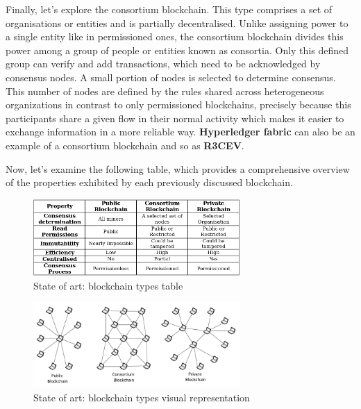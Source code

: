 Finally, let's explore the consortium blockchain. This type comprises a set of organisations or entities and is partially decentralised. Unlike assigning power to a single entity like in permissioned ones, the consortium blockchain divides this power among a group of people or entities known as consortia. Only this defined group can verify and add transactions, which need to be acknowledged by consensus nodes. A small portion of nodes is selected to determine consensus. This number of nodes are defined by the rules shared across heterogeneous organizations in contrast to only permissioned blockchains, precisely because this participants share a given flow in their normal activity which makes it easier to exchange information in a more reliable way. \textbf{Hyperledger fabric} can also be an example of a consortium blockchain and so as  \textbf{R3CEV}.

Now, let's examine the following table, which provides a comprehensive overview of the properties exhibited by each previously discussed blockchain.

\begin{figure}[H]
	\centering
	\includegraphics[width=0.7\textwidth]{assets/state-of-art/type-blockchains.png} %
	\caption{State of art: blockchain types table}
	\label{fig:sample-image} 
\end{figure}

\begin{figure}[H]
	\centering
	\includegraphics[width=0.7\textwidth]{assets/state-of-art/type-blockchains2.png} %
	\caption{State of art: blockchain types visual representation}
	\label{fig:sample-image} 
\end{figure}

